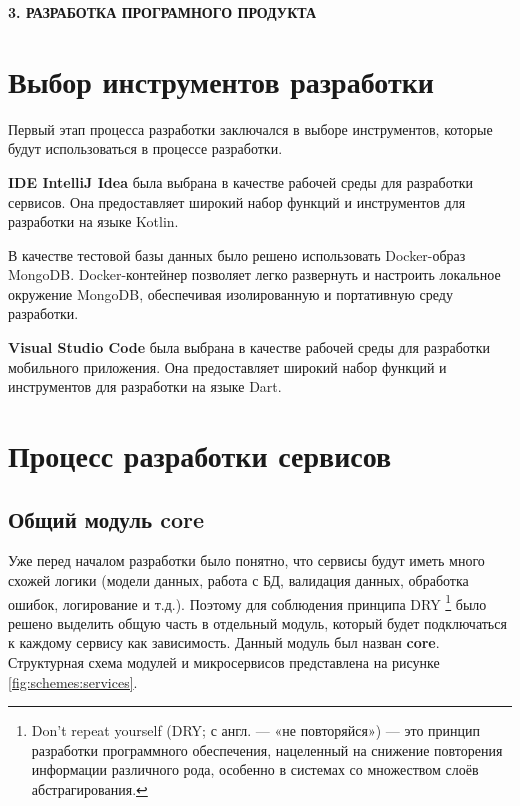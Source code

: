 \newpage
\begin{center}
  \textbf{\large 3. РАЗРАБОТКА ПРОГРАМНОГО ПРОДУКТА}
\end{center}

\section{Выбор инструментов разработки}
Первый этап процесса разработки заключался в выборе инструментов, которые будут использоваться в процессе разработки.

\textbf{IDE IntelliJ Idea} была выбрана в качестве рабочей среды для разработки сервисов.
Она предоставляет широкий набор функций и инструментов для разработки на языке Kotlin.

В качестве тестовой базы данных было решено использовать Docker-образ MongoDB. 
Docker-контейнер позволяет легко развернуть и настроить локальное окружение MongoDB, обеспечивая изолированную и портативную среду разработки. 

\textbf{Visual Studio Code} была выбрана в качестве рабочей среды для разработки мобильного приложения.
Она предоставляет широкий набор функций и инструментов для разработки на языке Dart.

\section{Процесс разработки сервисов}
\subsection{Общий модуль core}
Уже перед началом разработки было понятно, что сервисы будут иметь много схожей логики (модели данных, работа с БД, валидация данных, обработка ошибок, логирование и т.д.).
Поэтому для соблюдения принципа DRY 
\footnote{Don’t repeat yourself (DRY; с англ. — «не повторяйся») — это принцип разработки программного обеспечения, нацеленный на снижение повторения информации различного рода, особенно в системах со множеством слоёв абстрагирования.} 
было решено выделить общую часть в отдельный модуль, который будет подключаться к каждому сервису как зависимость. Данный модуль был назван \textbf{core}.
Структурная схема модулей и микросервисов представлена на рисунке \ref{fig:schemes:services}.

